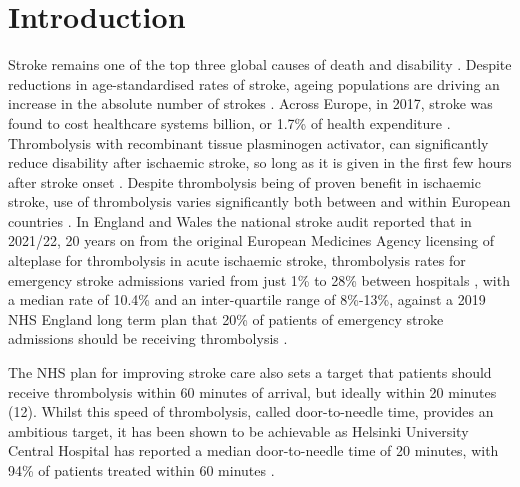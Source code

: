 \section{Introduction}



Stroke remains one of the top three global causes of death and disability \cite{feigin_global_2021}. Despite reductions in age-standardised rates of stroke, ageing populations are driving an increase in the absolute number of strokes \cite{feigin_global_2021}. Across Europe, in 2017, stroke was found to cost healthcare systems  billion, or 1.7\% of health expenditure \cite{luengo-fernandez_economic_2020}. Thrombolysis with recombinant tissue plasminogen activator, can significantly reduce disability after ischaemic stroke, so long as it is given in the first few hours after stroke onset \cite{emberson_effect_2014}. Despite thrombolysis being of proven benefit in ischaemic stroke, use of thrombolysis varies significantly both between and within European countries \cite{aguiar_de_sousa_access_2019}. In England and Wales the national stroke audit reported that in 2021/22, 20 years on from the original European Medicines Agency licensing of alteplase for thrombolysis in acute ischaemic stroke, thrombolysis rates for emergency stroke admissions varied from just 1\% to 28\% between hospitals \cite{sentinel_national_stroke_audit_programme_ssnap_2022}, with a median rate of 10.4\% and an inter-quartile range of 8\%-13\%, against a 2019 NHS England long term plan that 20\% of patients of emergency stroke admissions should be receiving thrombolysis \cite{nhs_long_term_plan_2019}.

The NHS plan for improving stroke care also sets a target that patients should receive thrombolysis within 60 minutes of arrival, but ideally within 20 minutes (12). Whilst this speed of thrombolysis, called door-to-needle time, provides an ambitious target, it has been shown to be achievable as Helsinki University Central Hospital has reported a median door-to-needle time of 20 minutes, with 94\% of patients treated within 60 minutes \cite{meretoja_reducing_2012}.


